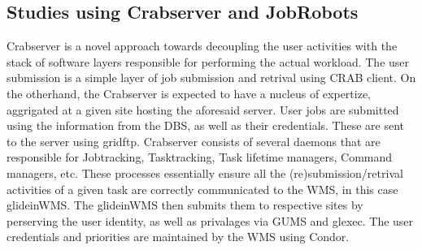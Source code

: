 \documentclass[a4paper]{jpconf}
\begin{document}
\subsection{Studies using Crabserver and JobRobots}
Crabserver is a novel approach towards decoupling the user activities with the stack of software
layers responsible for performing the actual workload. The user submission is a simple layer 
of job submission and retrival using CRAB client. On the otherhand, the Crabserver is expected 
to have a nucleus of expertize, aggrigated at a given site hosting the aforesaid server. User jobs
are submitted using the information from the DBS, as well as their credentials.
These are sent to the server using gridftp. Crabserver consists of several daemons that are responsible 
for Jobtracking, Tasktracking, Task lifetime managers, Command managers, etc. These processes
essentially ensure all the (re)submission/retrival activities of a given task are correctly communicated
to the WMS, in this case glideinWMS. The glideinWMS then submits them to respective sites 
by perserving the user identity, as well as privalages via GUMS and glexec. The user credentials
and priorities are maintained by the WMS using Condor.
\end{document}
